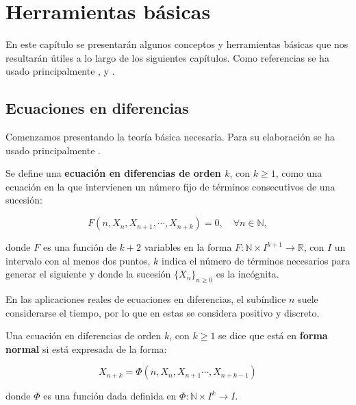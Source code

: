 
\chapter{Herramientas básicas}

En este capítulo se presentarán algunos conceptos y herramientas básicas que nos resultarán útiles a lo largo de los siguientes capítulos. Como referencias se ha usado principalmente \cite{brauerMathematicalModelsPopulation2012}, \cite{salinelliDiscreteDynamicalModels2014} y \cite{strogatzNonlinearDynamicsChaos1994}.

\section{Ecuaciones en diferencias}

Comenzamos presentando la teoría básica necesaria. Para su elaboración se ha usado principalmente \cite{salinelliDiscreteDynamicalModels2014}.

\begin{definition}
Se define una \textbf{ecuación en diferencias de orden $k$}, con $k\geq 1$, como una ecuación en la que intervienen un número fijo de términos consecutivos de una sucesión:

\begin{equation}
\label{def_ec_diferencias}
F(n,X_n, X_{n+1}, \cdots , X_{n+k}) = 0, \quad \forall n\in\mathbb{N},
\end{equation}


donde $F$ es una función de $k+2$ variables en la forma $F:\mathbb{N}\times I^{k+1}\rightarrow \mathbb{R}$, con $I$ un intervalo con al menos dos puntos, $k$ indica el número de términos necesarios para generar el siguiente y donde la sucesión $\{X_n\}_{n\geq 0}$ es la incógnita.
\end{definition}

En las aplicaciones reales de ecuaciones en diferencias, el subíndice $n$ suele considerarse el tiempo, por lo que en estas se considera positivo y discreto.

\begin{definition}
Una ecuación en diferencias de orden $k$, con $k\geq 1$ se dice que está en \textbf{forma normal} si está expresada de la forma:

\begin{equation}
\label{def_ec_forma_normal}
X_{n+k} = \Phi (n, X_n, X_{n+1}\cdots , X_{n+k-1})
\end{equation}


donde $\Phi$ es una función dada definida en $\Phi :\mathbb{N}\times I^{k}\rightarrow I$.
\end{definition}


